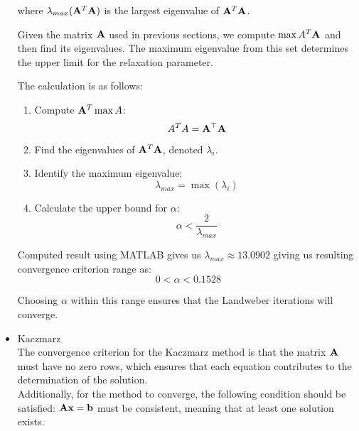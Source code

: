 \begin{itemize}
  where  $\lambda_{max}(\mathbf{A}^T\mathbf{A})$ is the largest eigenvalue of $ \mathbf{A}^T\mathbf{A} $.

  Given the matrix $\mathbf{A}$ used in previous sections, we compute $\max{A}^T\mathbf{A}$ and then find its eigenvalues. 
  The maximum eigenvalue from this set determines the upper limit for the relaxation parameter. 
  
  The calculation is as follows:
  \begin{enumerate}
      \item Compute $ \mathbf{A}^T\max{A} $:
      \begin{equation*}
          A^TA = \mathbf{A}^\top \mathbf{A}
      \end{equation*}
      
      \item Find the eigenvalues of $\mathbf{A}^T\mathbf{A}$, denoted $\lambda_i$.
      
      \item Identify the maximum eigenvalue:
      \begin{equation*}
        \lambda_{max} = \max(\lambda_i)
      \end{equation*}
      
      \item Calculate the upper bound for \( \alpha \):
      \begin{equation*}
        \alpha < \frac{2}{\lambda_{max}}
      \end{equation*}
  \end{enumerate}

  Computed result using MATLAB gives us $\lambda_{max} \approx 13.0902$ giving us resulting convergence criterion range as:
  \begin{equation*}
    0 < \alpha < 0.1528
  \end{equation*}

  Choosing \( \alpha \) within this range ensures that the Landweber iterations will converge.

  \item Kaczmarz \\
  
    The convergence criterion for the Kaczmarz method is that the matrix $ \mathbf{A} $ must have no zero rows, 
    which ensures that each equation contributes to the determination of the solution. \\
    Additionally, for the method to converge, the following condition should be satisfied: 
    $ \mathbf{Ax} = \mathbf{b} $ must be consistent, meaning that at least one solution exists.
\end{itemize}
